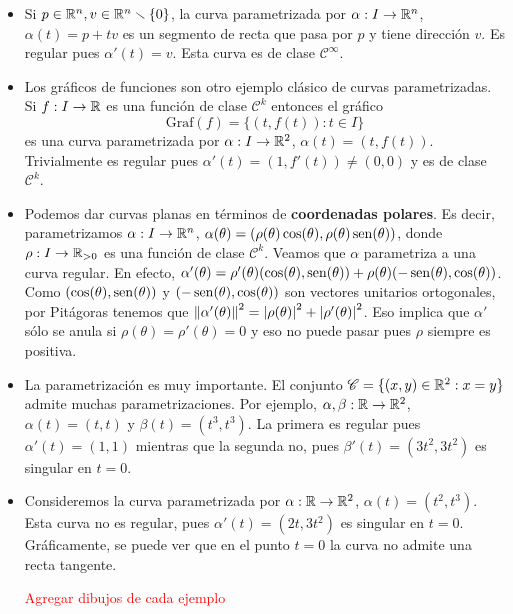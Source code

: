 \begin{ex}\hfill

\begin{itemize}\item Si $p\in\mathbb{R}^n, v\in\mathbb{R}^n\smallsetminus\{0\}$, la curva parametrizada por $\alpha:I\to\mathbb{R}^n$, $\alpha(t)=p+tv$ es un segmento de recta que pasa por $p$ y tiene dirección $v$. Es regular pues $\alpha'(t) = v$. Esta curva es de clase $\mathscr{C}^\infty$.
\item Los gráficos de funciones son otro ejemplo clásico de curvas parametrizadas. Si $f:I\to\mathbb{R}$ es una función de clase $\mathscr{C}^k$ entonces el gráfico $$\mathrm{Graf}(f) = \{(t,f(t)) : t\in I\}$$ es una curva parametrizada por $\alpha:I\to\mathbb{R}^2$, $\alpha(t)=(t,f(t))$. Trivialmente es regular pues $\alpha'(t)=(1,f'(t))\neq (0,0)$ y es de clase $\mathscr{C}^k$.
\item Podemos dar curvas planas en términos de \textbf{coordenadas polares}. Es decir, parametrizamos $\alpha:I\to\mathbb{R}^n$, $\alpha(\theta)=(\rho(\theta)\cos(\theta),\rho(\theta)\operatorname{sen}(\theta))$, donde $\rho:I\to\mathbb{R}_{>0}$ es una función de clase $\mathscr{C}^k$. Veamos que $\alpha$ parametriza a una curva regular. En efecto, $\alpha'(\theta) = \rho'(\theta)(\cos(\theta),\operatorname{sen}(\theta)) + \rho(\theta)(-\operatorname{sen}(\theta),\cos(\theta))$. Como $(\cos(\theta),\operatorname{sen}(\theta))$ y $(-\operatorname{sen}(\theta),\cos(\theta))$ son vectores unitarios ortogonales, por Pitágoras tenemos que $\left\| \alpha'(\theta) \right\|^2 = \left\lvert \rho(\theta) \right\rvert^2 + \left\lvert \rho'(\theta) \right\rvert^2$. Eso implica que $\alpha'$ sólo se anula si $\rho(\theta)=\rho'(\theta)=0$ y eso no puede pasar pues $\rho$ siempre es positiva.
\item La parametrización es muy importante. El conjunto $\mathscr{C}=\{(x,y)\in\mathbb{R}^2:x=y\}$ admite muchas parametrizaciones. Por ejemplo, $\alpha,\beta:\mathbb{R}\to\mathbb{R}^2$, $\alpha(t)=(t,t)$ y $\beta(t)=(t^3,t^3)$. La primera es regular pues $\alpha'(t)=(1,1)$ mientras que la segunda no, pues $\beta'(t)=(3t^2,3t^2)$ es singular en $t=0$.
\item Consideremos la curva parametrizada por $\alpha:\mathbb{R}\to\mathbb{R}^2$, $\alpha(t)=(t^2,t^3)$. Esta curva no es regular, pues $\alpha'(t)=(2t,3t^2)$ es singular en $t=0$. Gráficamente, se puede ver que en el punto $t=0$ la curva no admite una recta tangente.

\textcolor{red}{Agregar dibujos de cada ejemplo}
\end{itemize}
\end{ex}

